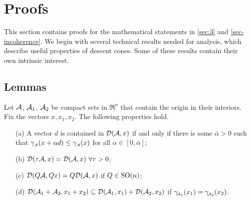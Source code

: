 \section{Proofs} \label{sec:7}

This section contains proofs for the mathematical statements in \autoref{sec:3} and \autoref{sec-incoherence}. We begin with several technical results needed for analysis, which describe useful properties of descent cones. Some of these results contain their own intrinsic interest.

\subsection{Lemmas} \label{sec:lemma}

\begin{lemma}\label{prop-descent-cone-properties} Let $\mathcal{A}$, $\mathcal{A}_1$, $\mathcal{A}_2$ be compact sets in $\Re^n$ that contain the origin in their interiors. Fix the vectors $x, x_1, x_2$. The following properties hold.
    \begin{itemize}
     \item[(a)] \label{prop-descent-cone-properties-a}
       A vector $d$ is contained in $\mathcal{D}(\mathcal{A}, x)$ if and only if there is some $\bar\alpha > 0$ such that $\gamma_{\scriptscriptstyle\mathcal{A}}(x + \alpha d) \leq \gamma_{\scriptscriptstyle\mathcal{A}}(x)$ for all $\alpha \in [0, \bar\alpha]$;
     \item[(b)] \label{prop-descent-cone-properties-b}
       $\mathcal{D}(\tau\mathcal{A}, x) = \mathcal{D}(\mathcal{A}, x)\ \forall\tau > 0$;
     \item[(c)] \label{prop-descent-cone-properties-c}
       $\mathcal{D}(Q\mathcal{A}, Qx) = Q\mathcal{D}(\mathcal{A}, x)$ if $Q\in \operatorname{SO}(n)$;
     \item[(d)] \label{prop-descent-cone-properties-d}
       $\mathcal{D}(\mathcal{A}_1 + \mathcal{A}_2, x_1 + x_2) \subseteq \mathcal{D}(\mathcal{A}_1, x_1) + \mathcal{D}(\mathcal{A}_2, x_2)$ if $\gamma_{\!\scriptscriptstyle\mathcal{A}_1}(x_1) = \gamma_{\!\scriptscriptstyle\mathcal{A}_2}(x_2)$.
     \end{itemize}
\end{lemma} 


